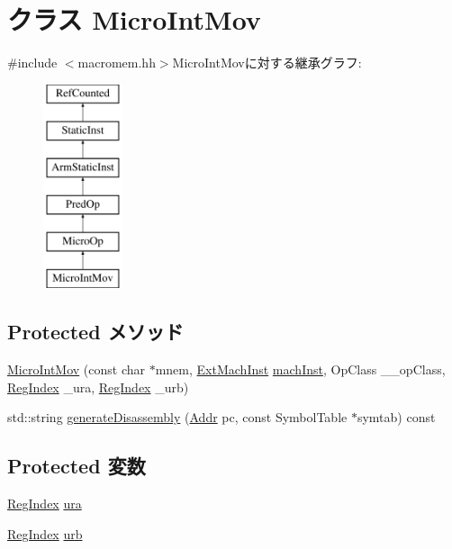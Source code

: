 \hypertarget{classArmISA_1_1MicroIntMov}{
\section{クラス MicroIntMov}
\label{classArmISA_1_1MicroIntMov}
}


{\ttfamily \#include $<$macromem.hh$>$}MicroIntMovに対する継承グラフ:\begin{figure}[H]
\begin{center}
\leavevmode
\includegraphics[height=6cm]{classArmISA_1_1MicroIntMov}
\end{center}
\end{figure}
\subsection*{Protected メソッド}
\begin{DoxyCompactItemize}
\item 
\hyperlink{classArmISA_1_1MicroIntMov_a21c0c6bc858b449669b48135356ccb7b}{MicroIntMov} (const char $\ast$mnem, \hyperlink{classStaticInst_a5605d4fc727eae9e595325c90c0ec108}{ExtMachInst} \hyperlink{classStaticInst_a744598b194ca3d4201d9414ce4cc4af4}{machInst}, OpClass \_\-\_\-opClass, \hyperlink{classStaticInst_a36d25e03e43fa3bb4c5482cbefe5e0fb}{RegIndex} \_\-ura, \hyperlink{classStaticInst_a36d25e03e43fa3bb4c5482cbefe5e0fb}{RegIndex} \_\-urb)
\item 
std::string \hyperlink{classArmISA_1_1MicroIntMov_a95d323a22a5f07e14d6b4c9385a91896}{generateDisassembly} (\hyperlink{classm5_1_1params_1_1Addr}{Addr} pc, const SymbolTable $\ast$symtab) const 
\end{DoxyCompactItemize}
\subsection*{Protected 変数}
\begin{DoxyCompactItemize}
\item 
\hyperlink{classStaticInst_a36d25e03e43fa3bb4c5482cbefe5e0fb}{RegIndex} \hyperlink{classArmISA_1_1MicroIntMov_a8e6cd3e234a4950e7a1a05f1b24cfee0}{ura}
\item 
\hyperlink{classStaticInst_a36d25e03e43fa3bb4c5482cbefe5e0fb}{RegIndex} \hyperlink{classArmISA_1_1MicroIntMov_a3771d4e6da84a09dbf436d6b1af2be46}{urb}
\end{DoxyCompactItemize}


